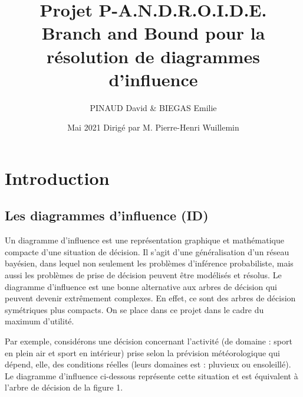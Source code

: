 \documentclass[12pt]{article}
\title{Projet P-A.N.D.R.O.I.D.E.\\
\bigbreak\textbf{Branch and Bound pour la résolution de diagrammes d'influence}}
\author{PINAUD David \& BIEGAS Emilie}
\date{Mai 2021 \bigbreak Dirigé par M. Pierre-Henri Wuillemin}
\affil{Université Sorbonne Sciences}
\begin{document}
\maketitle

\renewcommand{\contentsname}{Table des Matières}
\pagebreak
\tableofcontents
\pagebreak

\section{Introduction}

\subsection{Les diagrammes d'influence (ID)}
Un diagramme d'influence est une représentation graphique et mathématique compacte d'une situation de décision. Il s'agit d'une généralisation d'un réseau bayésien, dans lequel non seulement les problèmes d'inférence probabiliste, mais aussi les problèmes de prise de décision peuvent être modélisés et résolus. 
Le diagramme d'influence est une bonne alternative aux arbres de décision qui peuvent devenir extrêmement complexes. En effet, ce sont des arbres de décision symétriques plus compacts. On se place dans ce projet dans le cadre du maximum d'utilité.

Par exemple, considérons une décision concernant l'activité (de domaine : sport en plein air et sport en intérieur) prise selon la prévision météorologique qui dépend, elle, des conditions réelles (leurs domaines est : pluvieux ou ensoleillé). Le diagramme d'influence ci-dessous représente cette situation et est équivalent à l'arbre de décision de la figure 1.
\end{document}
